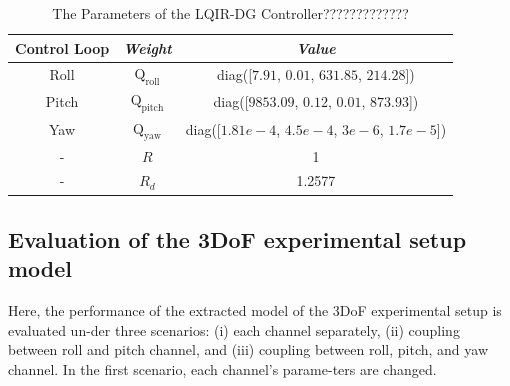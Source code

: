 \documentclass[3p,times]{elsarticle}
\begin{document}
\begin{table}[!h]
	\renewcommand{\arraystretch}{1.3}
	\caption{The Parameters of the LQIR-DG Controller?????????????}
	\begin{center}
	\begin{tabular}{c c c}
	\hline
	\textbf{Control Loop} & \textbf{\textit{Weight}}& \textbf{\textit{Value}} \\
	\hline
	Roll & 
	$\boldsymbol{{\mathrm{Q_{\text{roll}}}}}$ & diag([$7.91$, $0.01$, $631.85$, $214.28$])\\
	Pitch & 
	$\boldsymbol{{\mathrm{Q_{\text{pitch}}}}}$ & diag([$9853.09$, $0.12$, $0.01$, $873.93$])\\
	Yaw & 
	$\boldsymbol{{\mathrm{Q_{\text{yaw}}}}}$ & diag([$1.81e\!-\!4$, $4.5e\!-\!4$, $3e\!-\!6$, $1.7e\!-\!5$])\\
	-& $R$ & 1\\
	-& $R_{d}$ & 1.2577\\
	\hline
	\end{tabular}
	\end{center}
	\label{tab:control weight_new}
\end{table}




\subsection{Evaluation of the 3DoF experimental setup model}

Here, the performance of the extracted model of the 3DoF experimental setup is evaluated un-der three scenarios: (i) each channel separately, (ii) coupling between roll and pitch channel, and (iii) coupling between roll, pitch, and yaw channel. In the first scenario, each channel's parame-ters are changed.
\end{document}
